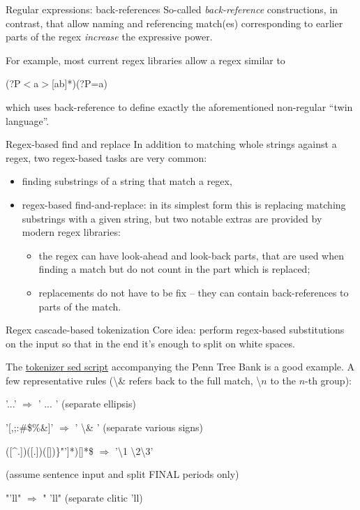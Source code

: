 \documentclass[style=upen, size=14pt]{powerdot}
\newcommand{\gold}{\color{arany}}
\theoremstyle{definition}
\begin{document}
\begin{slide}[toc=]{Regular expressions: back-references}
  So-called \emph{\gold back-reference} constructions, in contrast, that allow
  naming and referencing match(es) corresponding to earlier parts of the regex
  \emph{increase} the expressive power.\bigskip

  For example, most current regex libraries allow a regex similar to\bigskip

  \begin{center}
    (?P$<$a$>$[ab]*)(?P=a)\bigskip
  \end{center}

  which uses back-reference to define exactly the aforementioned non-regular
  ``twin language''.
\end{slide}

\begin{slide}[toc=]{Regex-based find and replace}
  In addition to matching whole strings against a regex, two regex-based tasks are
  very common:
  \begin{itemize}
  \item finding substrings of a string that match a regex,
  \item regex-based find-and-replace: in its simplest form this is replacing
    matching substrings with a given string, but two notable
    extras are provided by modern regex libraries:
    \begin{itemize}
    \item the regex can have look-ahead and look-back parts, that are used when
      finding a match but do not count in the part which is replaced;
    \item replacements do not have to be fix -- they can contain back-references
      to parts of the match.
    \end{itemize}
  \end{itemize}
\end{slide}

\begin{slide}[toc=Regex cascade]{Regex cascade-based tokenization}
  Core idea: perform regex-based substitutions on the input so that in the end
  it's enough to split on white spaces.\bigskip

  The
  \href{ftp://ftp.cis.upenn.edu/pub/treebank/public_html/tokenizer.sed}{tokenizer
    sed script} accompanying the Penn Tree Bank is a good example. A few
  representative rules (\textbackslash \& refers back to the full match,
  \textbackslash $n$ to the $n$-th group):\bigskip

  '...' $\Rightarrow$ ' ... ' (separate ellipsis)
  
  '[,;:\#\$\%\&]' $\Rightarrow$ ' \textbackslash \& ' (separate various signs)

  
  ([\^{}.]){(}[.]){\Large(}{\large[}]){\small\}}"'{\large]}*{\Large)}[\quad]*\$ $\Rightarrow$ '\textbackslash 1 \textbackslash 2\textbackslash 3'

  (assume sentence input and split FINAL periods only)

  "'ll" $\Rightarrow$ " 'll" (separate clitic 'll)
\end{slide}
\end{document}
